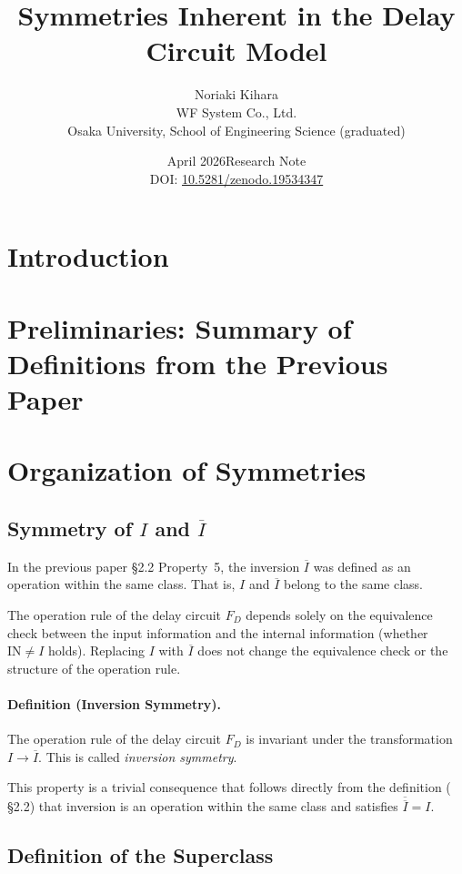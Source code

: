 \documentclass[12pt,a4paper]{article}
\title{Symmetries Inherent in the Delay Circuit Model}
\author{Noriaki Kihara\\
WF System Co., Ltd.\\
Osaka University, School of Engineering Science (graduated)}
\date{April 2026\quad Research Note\\[4pt]
DOI: \href{https://doi.org/10.5281/zenodo.19534347}{10.5281/zenodo.19534347}}
\begin{document}
\maketitle

\begin{abstract}
\end{abstract}

\section{Introduction}

\section{Preliminaries: Summary of Definitions from the Previous Paper}

\section{Organization of Symmetries}

\subsection{Symmetry of $I$ and $\overline{I}$}

In the previous paper \cite{kihara2026} \S2.2 Property~5, the inversion $\overline{I}$ was defined as
an operation within the same class. That is, $I$ and $\overline{I}$ belong to the same class.

The operation rule of the delay circuit $F_D$ depends solely on the equivalence check between the
input information and the internal information (whether $\mathrm{IN} \neq I$ holds). Replacing $I$
with $\overline{I}$ does not change the equivalence check or the structure of the operation rule.

\paragraph{Definition (Inversion Symmetry).}
The operation rule of the delay circuit $F_D$ is invariant under the transformation $I \to
\overline{I}$. This is called \emph{inversion symmetry}.

This property is a trivial consequence that follows directly from the definition
(\cite{kihara2026} \S2.2) that inversion is an operation within the same class and satisfies
$\overline{\overline{I}} = I$.

\subsection{Definition of the Superclass}
\end{document}
